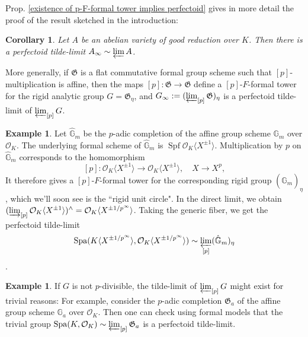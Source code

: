 \documentclass[10pt,oneside]{amsart}
\newtheorem{corollary}[theorem]{Corollary}
\theoremstyle{definition}
\newtheorem{remark}[theorem]{Remark}
\newtheorem{example}[theorem]{Example}
\begin{document}
Prop. \ref{existence of p-F-formal tower implies perfectoid} gives in more detail the proof of the result sketched in the introduction:
	\begin{corollary}\label{tilde-limit exists and is perfectoid in the good reduction case}
		Let $A$ be an abelian variety of good reduction over $K$. Then there is a perfectoid tilde-limit $A_\infty\sim \varprojlim A$.
	\end{corollary}
	 	
More generally, if $\mathfrak G$ is a flat commutative formal group scheme such that $[p]$-multiplication is affine, then the maps $[p]:\mathfrak G \rightarrow \mathfrak G$ define a $[p]$-$F$-formal tower for the rigid analytic group $G=\mathfrak G_\eta$, and  $G_\infty := (\varprojlim_{[p]}\mathfrak G)_\eta$ is a perfectoid tilde-limit of $\varprojlim_{[p]} G$. 

					
		
	\begin{example}\label{tower for Gm}
		Let $\hat{\mathbb G}_m$ be the $p$-adic completion of the affine group scheme $\mathbb G_m$ over $\mathcal O_K$. The underlying formal scheme of $\hat{\mathbb G}_m$ is $\operatorname {Spf} \mathcal O_K\langle X^{\pm 1} \rangle$.  Multiplication by $p$ on $\hat{\mathbb G}_m$ corresponds to the homomorphism
		\[[p]:\mathcal O_K\langle X^{\pm 1} \rangle\rightarrow  \mathcal O_K\langle X^{\pm 1} \rangle, \quad X\rightarrow X^{p},\]
		It therefore gives a $[p]$-$F$-formal tower for the corresponding rigid group $(\hat{\mathbb G}_m)_\eta$, which we'll soon see is the ``rigid unit circle". In the direct limit, we obtain $   (\varinjlim_{[p]} \mathcal O_K\langle X^{\pm 1} \rangle  )^{\wedge} = \mathcal O_K\langle  X^{\pm 1/p^\infty} \rangle$.  Taking the generic fiber, we get the perfectoid tilde-limit
		\[\operatorname{Spa}(K\langle X^{\pm 1/p^\infty} \rangle,\mathcal O_K\langle X^{\pm 1/p^\infty} \rangle)\sim \varprojlim_{[p]} (\hat{\mathbb G}_m)_\eta\].
	\end{example}
	
	
	\begin{example}
		If $G$ is not $p$-divisible, the tilde-limit of $\varprojlim_{[p]}G$ might exist for trivial reasons: For example, consider the $p$-adic completion  $\mathfrak G_a$  of the affine group scheme $\mathbb G_a$ over $\mathcal O_K$. Then one can check using formal models that the trivial group $\operatorname{Spa}(K,\mathcal O_K)\sim \varprojlim_{[p]}\mathfrak G_a$ is a perfectoid tilde-limit.
	\end{example}
	
\end{document}
